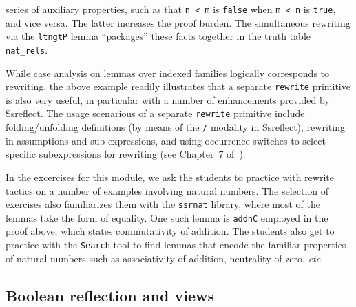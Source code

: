 \documentclass[blockstyle,preprint,nocopyrightspace]{sigplanconf}
\newcommand{\is}[1]{\textcolor{blue}{(Ilya: {#1})}}
\newcommand{\an}[1]{\textcolor{red}{(Aleks: {#1})}}
\newcommand{\code}[1]{\lstinline{#1}}
\newcommand{\etc}{\emph{etc}}
\begin{document}
series of auxiliary properties, such as that \code{n < m} is
\code{false} when \code{m < n} is \code{true}, and vice versa. The
latter increases the proof burden. The simultaneous rewriting via the
\code{ltngtP} lemma ``packages'' these facts together in the truth
table \code{nat_rels}.
%

While case analysis on lemmas over indexed families logically
corresponds to rewriting, the above example readily illustrates that a
separate \code{rewrite} primitive is also very useful, in particular
with a number of enhancements provided by Ssreflect. The usage
scenarious of a separate \code{rewrite} primitive include
folding/unfolding definitions (by means of the \code{/} modality in
Ssreflect), rewriting in assumptions and sub-expressions, and using
occurrence switches to select specific subexpressions for rewriting
(see Chapter~7 of~\cite{Gonthier-al:TR}).
%

In the excercises for this module, we ask the students to practice
with rewrite tactics on a number of examples involving natural
numbers. The selection of exercises also familiarizes them with the
\code{ssrnat} library, where most of the lemmas take the form of
equality. One such lemma is \code{addnC} employed in the proof above,
which states commutativity of addition. The students also get to
practice with the \code{Search} tool to find lemmas that encode the
familiar properties of natural numbers such as associativity of
addition, neutrality of zero, \etc.

\subsection{Boolean reflection and views}
\label{sec:views}
%
\end{document}
